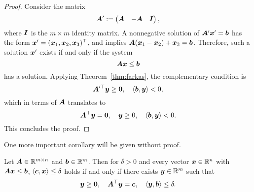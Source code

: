 \begin{proof}
 Consider the matrix
 \begin{equation*}
 \bm{A}' := 
  \begin{pmatrix}
   \bm{A} & -\bm{A} & \bm{I}
  \end{pmatrix},
 \end{equation*}
 where $\bm{I}$ is the $m\times m$ identity matrix. A nonnegative solution of $\bm{A}'\bm{x}'=\bm{b}$ has the form $\bm{x}'=(\bm{x}_1,\bm{x}_2,\bm{x}_3)^{\top}$, and implies $\bm{A}(\bm{x}_1-\bm{x}_2)+\bm{x}_3 = \bm{b}$. Therefore, such a solution $\bm{x}'$ exists if and only if the system
 \begin{equation*}
  \bm{A}\bm{x}\leq \bm{b}
 \end{equation*}
has a solution. Applying Theorem~\ref{thm:farkas}, the complementary condition is 
\begin{equation*}
 \bm{A}'^{\top}\bm{y}\geq \bm{0}, \quad \langle {\bm{b}}, {\bm{y}} \rangle<0,
\end{equation*}
which in terms of $\bm{A}$ translates to 
\begin{equation*}
 \bm{A}^{\top}\bm{y}=\bm{0}, \quad \bm{y}\geq 0, \quad \langle {\bm{b}}, {\bm{y}} \rangle<0.
\end{equation*}
This concludes the proof.
\end{proof}

One more important corollary will be given without proof.

\begin{corollary}\label{cor:farkas3}
 Let $\bm{A}\in \mathbb{R}^{m\times n}$ and $\bm{b}\in \mathbb{R}^m$. Then for $\delta>0$ and every vector  $\bm{x}\in \mathbb{R}^n$ with $\bm{A}\bm{x}\leq \bm{b}$, $\langle {\bm{c}}, {\bm{x}} \rangle\leq \delta$ holds if and only if there exists $\bm{y}\in \mathbb{R}^m$ such that
 \begin{equation*}
  \bm{y}\geq \bm{0}, \quad \bm{A}^{\top}\bm{y}=\bm{c}, \quad \langle {\bm{y}}, {\bm{b}} \rangle\leq \delta.
 \end{equation*}

\end{corollary}


